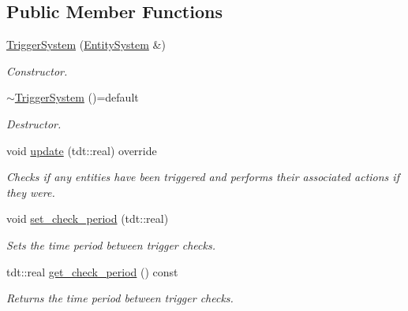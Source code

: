 \subsection*{Public Member Functions}
\begin{DoxyCompactItemize}
\item 
\hyperlink{class_trigger_system_ac7e83dc3b48c6f0759834752dd896a99}{Trigger\+System} (\hyperlink{class_entity_system}{Entity\+System} \&)
\begin{DoxyCompactList}\small\item\em Constructor. \end{DoxyCompactList}\item 
\hyperlink{class_trigger_system_a7c897416114b31de2c7371243f6213db}{$\sim$\+Trigger\+System} ()=default
\begin{DoxyCompactList}\small\item\em Destructor. \end{DoxyCompactList}\item 
void \hyperlink{class_trigger_system_ac85976839b1316705e1a493fb40c3ef2}{update} (tdt\+::real) override
\begin{DoxyCompactList}\small\item\em Checks if any entities have been triggered and performs their associated actions if they were. \end{DoxyCompactList}\item 
void \hyperlink{class_trigger_system_a7813aca92f90b5fdf6dd24e9a664a420}{set\+\_\+check\+\_\+period} (tdt\+::real)
\begin{DoxyCompactList}\small\item\em Sets the time period between trigger checks. \end{DoxyCompactList}\item 
tdt\+::real \hyperlink{class_trigger_system_a0161788568894de9f99f362249174b97}{get\+\_\+check\+\_\+period} () const 
\begin{DoxyCompactList}\small\item\em Returns the time period between trigger checks. \end{DoxyCompactList}\end{DoxyCompactItemize}
